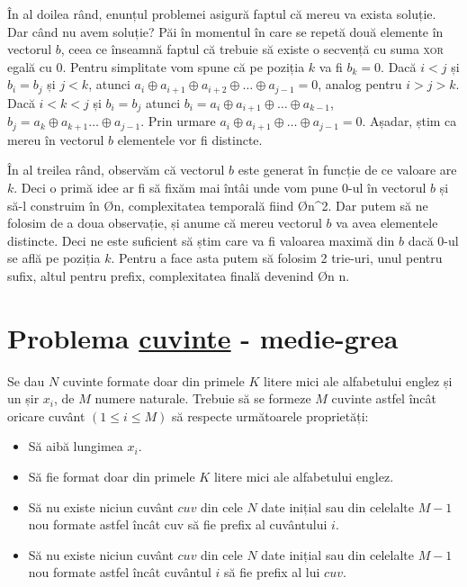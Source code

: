 În al doilea rând, enunțul problemei asigură faptul că mereu va exista soluție. Dar când nu avem soluție? Păi în momentul în care se repetă două elemente în vectorul $b$, ceea ce înseamnă faptul că trebuie să existe o secvență cu suma \textsc{xor} egală cu $0$. Pentru simplitate vom spune că pe poziția $k$ va fi $b_k = 0$. Dacă $i < j$ și $b_i = b_j$ și $j < k$, atunci $a_i \oplus a_{i+1} \oplus a_{i+2} \oplus \dots \oplus a_{j-1} = 0$, analog pentru $i > j > k$. Dacă $i < k < j$ și $b_i = b_j$ atunci $b_i = a_i \oplus a_{i+1} \oplus \dots \oplus a_{k-1}$, $b_j = a_k \oplus a_{k+1} \dots \oplus a_{j-1}$. Prin urmare $a_i \oplus a_{i+1} \oplus \dots \oplus a_{j-1} = 0$. Așadar, știm ca mereu în vectorul $b$ elementele vor fi distincte.

În al treilea rând, observăm că vectorul $b$ este generat în funcție de ce valoare are $k$. Deci o primă idee ar fi să fixăm mai întâi unde vom pune $0$-ul în vectorul $b$ și să-l construim în \O{n}, complexitatea temporală fiind \O{n^2}. Dar putem să ne folosim de a doua observație, și anume că mereu vectorul $b$ va avea elementele distincte. Deci ne este suficient să știm care va fi valoarea maximă din $b$ dacă $0$-ul se află pe poziția $k$. Pentru a face asta putem să folosim 2 trie-uri, unul pentru sufix, altul pentru prefix, complexitatea finală devenind \O{n \log n}.

\section{Problema \href{https://kilonova.ro/problems/65}{cuvinte} - medie-grea} 
Se dau $N$ cuvinte formate doar din primele $K$ litere mici ale alfabetului englez și un șir $x_i$, de $M$ numere naturale. Trebuie să se formeze $M$ cuvinte astfel încât oricare cuvânt $(1 \leq i \leq M)$ să respecte următoarele proprietăți:
\begin{itemize}
        \item Să aibă lungimea $x_i$.
        \item Să fie format doar din primele $K$ litere mici ale alfabetului englez.
        \item Să nu existe niciun cuvânt $cuv$ din cele $N$ date inițial sau din celelalte $M-1$  nou formate astfel încât cuv să fie prefix al cuvântului $i$.
        \item Să nu existe niciun cuvânt $cuv$ din cele $N$ date inițial sau din celelalte $M-1$ nou formate astfel încât cuvântul $i$ să fie prefix al lui $cuv$.
\end{itemize}

